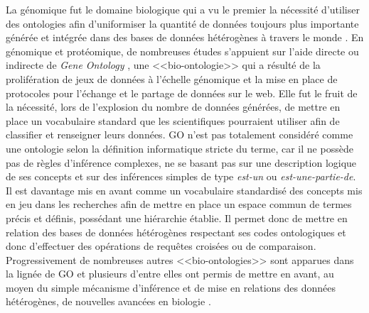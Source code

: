 La génomique fut le domaine biologique qui a vu le premier la nécessité d'utiliser des ontologies afin d'uniformiser la quantité de données toujours plus importante générée et intégrée dans des bases de données hétérogènes à travers le monde \cite{schuurman_ontologies_2008}.
En génomique et protéomique, de nombreuses études s'appuient sur l'aide directe ou indirecte de \textit{Gene Ontology} \cite{ashburner_gene_2000}, une <<bio-ontologie>> qui a résulté de la prolifération de jeux de données à l'échelle génomique et la mise en place de protocoles pour l'échange et le partage de données sur le web. Elle fut le fruit de la nécessité, lors de l'explosion du nombre de données générées, de mettre en place un vocabulaire standard que les scientifiques pourraient utiliser afin de classifier et renseigner leurs données. GO n'est pas totalement considéré comme une ontologie selon la définition informatique stricte du terme, car il ne possède pas de règles d'inférence complexes, ne se basant pas sur une description logique de ses concepts et sur des inférences simples de type \textit{est-un} ou \textit{est-une-partie-de}. Il est davantage mis en avant comme un vocabulaire standardisé des concepts mis en jeu dans les recherches afin de mettre en place un espace commun de termes précis et définis, possédant une hiérarchie établie. Il permet donc de mettre en relation des bases de données hétérogènes respectant ses codes ontologiques et donc d'effectuer des opérations de requêtes croisées ou de comparaison. Progressivement de nombreuses autres <<bio-ontologies>> sont apparues dans la lignée de GO et plusieurs d'entre elles ont permis de mettre en avant, au moyen du simple mécanisme d'inférence et de mise en relations des données hétérogènes, de nouvelles avancées en biologie \cite{yoshikawa_drug_2004, stenzhorn_biotop_2008, smith_obo_2007}.

